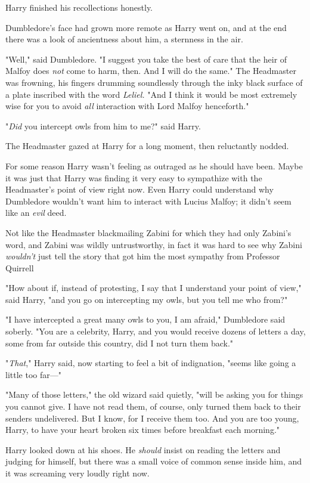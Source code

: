 Harry finished his recollections honestly.

Dumbledore's face had grown more remote as Harry went on, and at the end there
was a look of ancientness about him, a sternness in the air.

"Well," said Dumbledore. "I suggest you take the best of care that the heir of
Malfoy does \emph{not} come to harm, then. And I will do the same." The
Headmaster was frowning, his fingers drumming soundlessly through the inky
black surface of a plate inscribed with the word \emph{Leliel.} "And I think it
would be most extremely wise for you to avoid \emph{all} interaction with Lord
Malfoy henceforth."

"\emph{Did} you intercept owls from him to me?" said Harry.

The Headmaster gazed at Harry for a long moment, then reluctantly nodded.

For some reason Harry wasn't feeling as outraged as he should have been. Maybe
it was just that Harry was finding it very easy to sympathize with the
Headmaster's point of view right now. Even Harry could understand why
Dumbledore wouldn't want him to interact with Lucius Malfoy; it didn't seem
like an \emph{evil} deed.

Not like the Headmaster blackmailing Zabini{\el} for which they had only
Zabini's word, and Zabini was wildly untrustworthy, in fact it was hard to see
why Zabini \emph{wouldn't} just tell the story that got him the most sympathy
from Professor Quirrell{\el}

"How about if, instead of protesting, I say that I understand your point of
view," said Harry, "and you go on intercepting my owls, but you tell me who
from?"

"I have intercepted a great many owls to you, I am afraid," Dumbledore said
soberly. "You are a celebrity, Harry, and you would receive dozens of letters a
day, some from far outside this country, did I not turn them back."

"\emph{That}," Harry said, now starting to feel a bit of indignation, "seems
like going a little too far—"

"Many of those letters," the old wizard said quietly, "will be asking you for
things you cannot give. I have not read them, of course, only turned them back
to their senders undelivered. But I know, for I receive them too. And you are
too young, Harry, to have your heart broken six times before breakfast each
morning."

Harry looked down at his shoes. He \emph{should} insist on reading the letters
and judging for himself, but{\el} there was a small voice of common sense
inside him, and it was screaming very loudly right now.

